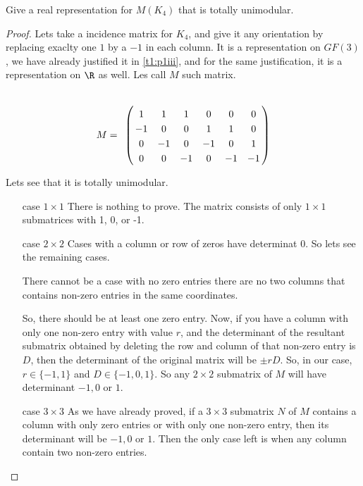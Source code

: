 \prob
{
    Give a real representation for $M(K_4)$ that is totally unimodular.
}
\begin{proof}
    Lets take a incidence matrix for $K_4$, and give it any orientation by replacing exaclty one $1$ by a $-1$ in each column. 
    It is a representation on $GF(3)$, we have already justified it in \ref{t1:p1iii}, and for the same justification, it is a 
    representation on $\R$ as well. Les call $M$ such matrix.\pn
    
    \begin{align}
        M =
            \bordermatrix{
                    &       &       &       &       &       &       \cr
                    &   1   &   1   &   1   &   0   &   0   &   0   \cr
                    &  -1   &   0   &   0   &   1   &   1   &   0   \cr
                    &   0   &  -1   &   0   &  -1   &   0   &   1   \cr
                    &   0   &   0   &  -1   &   0   &  -1   &  -1   
            }    
    \end{align}
    
    
    Lets see that it is totally unimodular.\pn
    
    \begin{itemize}
        \item [case $1 \times 1$] 
            There is nothing to prove. The matrix consists of only $1\times 1$ submatrices with 1, 0, or -1.
        
        \item [case $2 \times 2$] 
            Cases with a column or row of zeros have determinat 0. So lets see the remaining cases.\pn 
            
            There cannot be a case with no zero entries there are no two columns that contains non-zero entries in the same coordinates.\pn
            
            So, there should be at least one zero entry. Now, if you have a column with only one non-zero entry with value $r$, and the determinant of
            the resultant submatrix obtained by deleting the row and column of that non-zero entry is $D$, then the determinant of the original
            matrix will be $\pm r D$. So, in our case, $r \in \{-1, 1\}$ and $D \in \{-1, 0, 1\}$. So any $2 \times 2$ submatrix of $M$ will have 
            determinant $-1, 0$ or $1$.
            
        \item [case $3 \times 3$]
            As we have already proved, if a $3 \times 3$ submatrix $N$ of $M$ contains a column with only zero entries or with only one non-zero entry, then
            its determinant will be $-1, 0$ or $1$. Then the only case left is when any column contain two non-zero entries.\pn
            

\end{itemize}
\end{proof}
